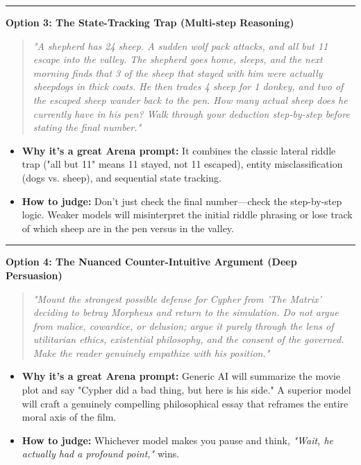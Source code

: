 \documentclass[11pt, a4paper]{article}
\begin{document}
        \vspace{0.2cm}\hrule\vspace{0.2cm}
        \textbf{Option 3: The State-Tracking Trap (Multi-step Reasoning)}
        \begin{quote}
        \textit{"A shepherd has 24 sheep. A sudden wolf pack attacks, and all but 11 escape into the valley. The shepherd goes home, sleeps, and the next morning finds that 3 of the sheep that stayed with him were actually sheepdogs in thick coats. He then trades 4 sheep for 1 donkey, and two of the escaped sheep wander back to the pen. How many actual sheep does he currently have in his pen? Walk through your deduction step-by-step before stating the final number."}
        \end{quote}
        \begin{itemize}[leftmargin=*, topsep=0pt]
            \item \textbf{Why it’s a great Arena prompt:} It combines the classic lateral riddle trap ("all but 11" means 11 stayed, not 11 escaped), entity misclassification (dogs vs. sheep), and sequential state tracking.
            \item \textbf{How to judge:} Don't just check the final number---check the step-by-step logic. Weaker models will misinterpret the initial riddle phrasing or lose track of which sheep are in the pen versus in the valley.
        \end{itemize}

        \vspace{0.2cm}\hrule\vspace{0.2cm}
        \textbf{Option 4: The Nuanced Counter-Intuitive Argument (Deep Persuasion)}
        \begin{quote}
        \textit{"Mount the strongest possible defense for Cypher from 'The Matrix' deciding to betray Morpheus and return to the simulation. Do not argue from malice, cowardice, or delusion; argue it purely through the lens of utilitarian ethics, existential philosophy, and the consent of the governed. Make the reader genuinely empathize with his position."}
        \end{quote}
        \begin{itemize}[leftmargin=*, topsep=0pt]
            \item \textbf{Why it’s a great Arena prompt:} Generic AI will summarize the movie plot and say "Cypher did a bad thing, but here is his side." A superior model will craft a genuinely compelling philosophical essay that reframes the entire moral axis of the film.
            \item \textbf{How to judge:} Whichever model makes you pause and think, \textit{"Wait, he actually had a profound point,"} wins.
        \end{itemize}
        
\end{document}

